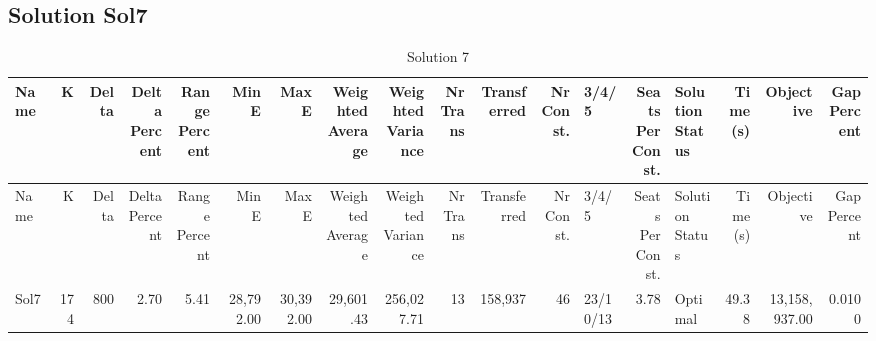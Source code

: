 \documentclass[a4paper]{article}
\begin{document}
\clearpage
\subsection{Solution Sol7}

{\scriptsize
\begin{longtable}{lrrrrrrrrrrrlrlrrr}
\caption{Solution 7}
\\ \toprule
Name &K &Delta &\shortstack{Delta\\Percent} &\shortstack{Range\\Percent} &Min E &Max E &\shortstack{Weighted\\Average} &\shortstack{Weighted\\Variance} &\shortstack{Nr\\Trans} &Transferred &\shortstack{Nr\\Const.} &3/4/5 &\shortstack{Seats\\Per\\Const.} &\shortstack{Solution\\Status} &\shortstack{Time\\(s)} &Objective &\shortstack{Gap\\Percent} \\ \midrule
\endfirsthead
\toprule
Name &K &Delta &\shortstack{Delta\\Percent} &\shortstack{Range\\Percent} &Min E &Max E &\shortstack{Weighted\\Average} &\shortstack{Weighted\\Variance} &\shortstack{Nr\\Trans} &Transferred &\shortstack{Nr\\Const.} &3/4/5 &\shortstack{Seats\\Per\\Const.} &\shortstack{Solution\\Status} &\shortstack{Time\\(s)} &Objective &\shortstack{Gap\\Percent} \\ \midrule
\endhead
\bottomrule
\endfoot
Sol7&174&800& 2.70& 5.41&28,792.00&30,392.00&29,601.43&256,027.71&13&158,937&46&23/10/13& 3.78&Optimal&49.38&13,158,937.00&0.0100\\ 
\end{longtable}

}
\end{document}
